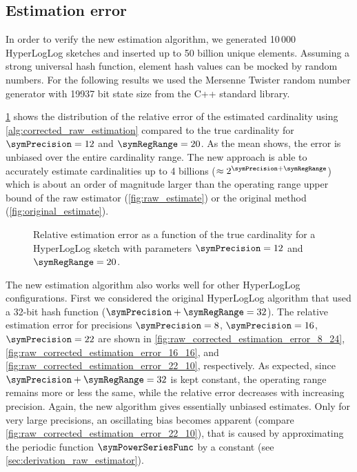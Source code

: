 \documentclass[a4paper]{scrartcl}
\begin{document}
\subsection{Estimation error}
In order to verify the new estimation algorithm, we generated 10\,000 HyperLogLog sketches and inserted up to 50 billion unique elements. Assuming a strong universal hash function, element hash values can be mocked by random numbers. For the following results we used the Mersenne Twister random number generator with 19937 bit state size from the C++ standard library.

\cref{fig:raw_corrected_estimation_error_12_20} shows the distribution of the relative error of the estimated cardinality using \cref{alg:corrected_raw_estimation} compared to the true cardinality for $\symPrecision=12$ and $\symRegRange=20$. As the mean shows, the error is unbiased over the entire cardinality range. The new approach is able to accurately estimate cardinalities up to 4 billions ($\approx 2^{\symPrecision+\symRegRange}$) which is about an order of magnitude larger than the operating range upper bound of the raw estimator (\cref{fig:raw_estimate}) or the original method (\cref{fig:original_estimate}).

\begin{figure}
\centering

\caption{Relative estimation error as a function of the true cardinality for a HyperLogLog sketch with parameters $\symPrecision = 12$ and $\symRegRange=20$.}
\label{fig:raw_corrected_estimation_error_12_20}
\end{figure}

The new estimation algorithm also works well for other HyperLogLog configurations. First we considered the original HyperLogLog algorithm that used a 32-bit hash function ($\symPrecision + \symRegRange = 32$). The relative estimation error for precisions $\symPrecision=8$, $\symPrecision=16$, $\symPrecision=22$ are shown in \cref{fig:raw_corrected_estimation_error_8_24}, \cref{fig:raw_corrected_estimation_error_16_16}, and \cref{fig:raw_corrected_estimation_error_22_10}, respectively. As expected, since  $\symPrecision + \symRegRange = 32$ is kept constant, the operating range remains more or less the same, while the relative error decreases with increasing precision. Again, the new algorithm gives essentially unbiased estimates. Only for very large precisions, an oscillating bias becomes apparent (compare \cref{fig:raw_corrected_estimation_error_22_10}), that is caused by approximating the periodic function $\symPowerSeriesFunc$ by a constant (see \cref{sec:derivation_raw_estimator}).
\end{document}
